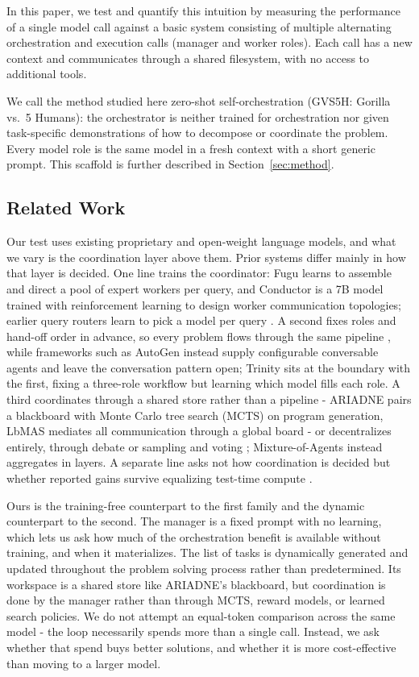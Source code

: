 \documentclass[journal]{IEEEtran}
\begin{document}
In this paper, we test and quantify this intuition by measuring the performance of a single model call against a basic system consisting of multiple alternating orchestration and execution calls (manager and worker roles). Each call has a new context and communicates through a shared filesystem, with no access to additional tools.
 
We call the method studied here zero-shot self-orchestration (GVS5H: Gorilla vs.\ 5 Humans): the orchestrator is neither trained for orchestration nor
given task-specific demonstrations of how to decompose or coordinate the problem. Every model role is the same model in a fresh context
with a short generic prompt. This scaffold is further described in Section~\ref{sec:method}.

\subsection{Related Work}
\label{sec:related}

Our test uses existing proprietary and open-weight language models, and what
we vary is the coordination layer above them. Prior systems differ mainly in how that layer is
decided. One line trains the coordinator: Fugu \cite{sakana2026} learns to assemble
and direct a pool of expert workers per query, and Conductor \cite{nielsen2025} is a 7B
model trained with reinforcement learning to design worker communication topologies; earlier query routers learn to
pick a model per query \cite{ong2024}. A second fixes roles and hand-off order in advance,
so every problem flows through the same pipeline
\cite{hong2023,qian2023,li2023,huang2023,islam2024}, while frameworks such as AutoGen
\cite{wu2023} instead supply configurable conversable agents and leave the conversation
pattern open; Trinity \cite{xu2025} sits at the boundary with the first, fixing a
three-role workflow but learning which model fills each role. A third coordinates through a
shared store rather than a pipeline - ARIADNE \cite{wei2026} pairs a blackboard with Monte
Carlo tree search (MCTS)
on program generation, LbMAS \cite{han2025} mediates all communication through a global
board - or decentralizes entirely, through debate \cite{du2023} or sampling and voting
\cite{li2024}; Mixture-of-Agents \cite{wangj2024a} instead aggregates in layers. A
separate line asks not how coordination is decided but whether reported gains survive
equalizing test-time compute \cite{wangj2024b,tran2026}.

Ours is the training-free counterpart to the first family and the dynamic counterpart to the
second. The manager is a fixed prompt with no learning, which lets us ask how much of the
orchestration benefit is available without training, and when it materializes. The list of tasks is dynamically generated and updated throughout the problem solving process rather than predetermined.
Its workspace is a shared store like ARIADNE's blackboard, but coordination is done by the manager
rather than through MCTS, reward models, or learned search policies. We do not attempt
an equal-token comparison across the same model - the loop necessarily spends more than a single call. 
Instead, we ask whether that spend buys better solutions, and whether it is more cost-effective than moving to a larger model.
\end{document}
